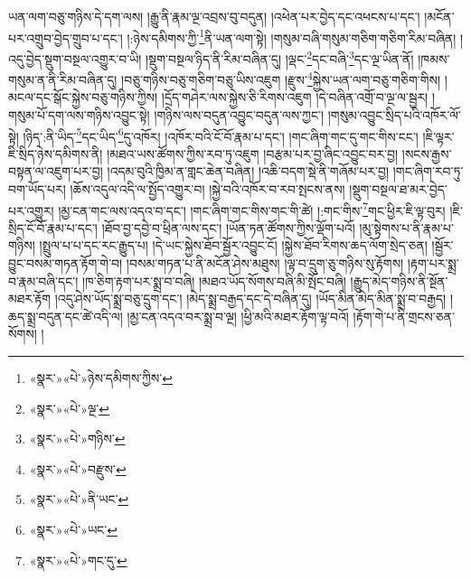 ཡན་ལག་བཅུ་གཉིས་དེ་དག་ལས། །རྒྱུ་ནི་རྣམ་ལྔ་འབྲས་བུ་བདུན། །འཕེན་པར་བྱེད་དང་འཕངས་པ་དང་། །མངོན་པར་འགྲུབ་བྱེད་གྲུབ་པ་དང་། །:ཉེས་དམིགས་ཀྱི་\footnote{«སྣར་»«པེ་»ཉེས་དམིགས་ཀྱིས་}ནི་ཡན་ལག་སྟེ། །གསུམ་བཞི་གསུམ་གཅིག་གཅིག་རིམ་བཞིན། །འདུ་བྱེད་སྡུག་བསྔལ་འགྱུར་བ་ཡི། །སྡུག་བསྔལ་ཉིད་ནི་རིམ་བཞིན་དུ། །ལྡང་\footnote{«སྣར་»«པེ་»ལྔ་}དང་བཞི་\footnote{«སྣར་»«པེ་»གཉིས་}དང་ལྔ་ཡིན་ནོ། །ཁམས་གསུམ་ན་ནི་རིམ་བཞིན་དུ། །བཅུ་གཉིས་བཅུ་གཅིག་བཅུ་ཡིས་འཇུག །རྫུས་\footnote{«སྣར་»«པེ་»བརྫུས་}སྐྱེས་ཡན་ལག་བཅུ་གཅིག་གིས། །མངལ་དང་སྒོང་སྐྱེས་བཅུ་གཉིས་ཀྱིས། །དྲོད་གཤེར་ལས་སྐྱེས་ཅི་རིགས་འཇུག །དེ་བཞིན་འགྲོ་བ་ལྔ་ལ་སྦྱར། །གསུམ་པོ་དག་ལས་གཉིས་འབྱུང་སྟེ། །གཉིས་ལས་བདུན་འབྱུང་བདུན་ལས་ཀྱང་། །གསུམ་འབྱུང་སྲིད་པའི་འཁོར་ལོ་སྟེ། །ཉིད་:ནི་ཡིད་\footnote{«སྣར་»«པེ་»ནི་ཡང་}དང་ཡིད་\footnote{«སྣར་»«པེ་»ཡང་}དུ་འཁོར། །འཁོར་བའི་ངོ་བོ་རྣམ་པ་དང་། །གང་ཞིག་གང་དུ་གང་གིས་ངང་། །ཇི་ལྟར་ཇི་སྲིད་ཉེས་དམིགས་ནི། །མཐའ་ཡས་ཚོགས་ཀྱིས་རབ་ཏུ་འཇུག །བརྩམ་པར་བྱ་ཞིང་འབྱུང་བར་བྱ། །སངས་རྒྱས་བསྟན་ལ་འཇུག་པར་བྱ། །འདམ་བུའི་ཁྱིམ་ན་གླང་ཆེན་བཞིན། །འཆི་བདག་སྡེ་ནི་གཞོམ་པར་བྱ། །གང་ཞིག་རབ་ཏུ་བག་ཡོད་པར། །ཆོས་འདུལ་འདི་ལ་སྤྱོད་འགྱུར་བ། །སྐྱེ་བའི་འཁོར་བ་རབ་སྤངས་ནས། །སྡུག་བསྔལ་ཐ་མར་བྱེད་པར་འགྱུར། །མྱ་ངན་གང་ལས་འདའ་བ་དང་། །གང་ཞིག་གང་གིས་གང་གི་ཚེ། །:གང་གིས་\footnote{«སྣར་»«པེ་»གང་དུ་}གང་ཕྱིར་ཇི་ལྟ་བུར། །ཇི་སྲིད་ངོ་བོ་རྣམ་པ་དང་། །ཐོབ་བྱ་དབྱེ་བ་ཕྲིན་ལས་དང་། །ཡོན་ཏན་ཚོགས་ཀྱིས་ལྡོག་པའོ། །མུ་སྟེགས་པ་ནི་རྣམ་པ་གཉིས། །སྤྲུལ་པ་པ་དང་རང་རྒྱུད་པ། །དེ་ཡང་སྐྱེས་ཐོབ་སྦྱོར་འབྱུང་ངོ། །སྐྱེས་ཐོབ་རིགས་ཆད་ལོག་སྲེད་ཅན། །སྦྱོར་བྱུང་བསམ་གཏན་རྟོག་གེ་བ། །བསམ་གཏན་པ་ནི་མངོན་ཤེས་མཐུས། །ལྟ་བ་དྲུག་ཅུ་གཉིས་སུ་རྟོགས། །རྟག་པར་སྨྲ་བ་རྣམ་བཞི་དང་། །ཁ་ཅིག་རྟག་པར་སྨྲ་བ་བཞི། །མཐའ་ཡོད་སོགས་བཞི་མི་སྤོང་བཞི། །རྒྱུད་མེད་གཉིས་ནི་སྔོན་མཐར་རྟོག །འདུ་ཤེས་ཡོད་སྨྲ་བཅུ་དྲུག་དང་། །མེད་སྨྲ་བརྒྱད་དང་དེ་བཞིན་དུ། །ཡོད་མིན་མེད་མིན་སྨྲ་བ་བརྒྱད། །ཆད་སྨྲ་བདུན་དང་ཚེ་འདི་ལ། །མྱ་ངན་འདའ་བར་སྨྲ་བ་ལྔ། །ཕྱི་མའི་མཐར་རྟོག་ལྟ་བའོ། །རྟོག་གེ་པ་ནི་གྲངས་ཅན་སོགས། །
